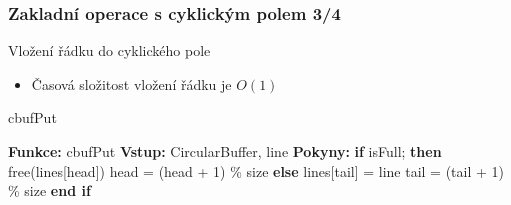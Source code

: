 \documentclass[]{fitthesispresn}
\begin{document}
    \begin{frame}
        \frametitle{Zakladní operace s cyklickým polem 3/4}
        Vložení řádku do cyklického pole
        \begin{itemize}
            \item Časová složitost vložení řádku je $O(1)$
        \end{itemize}
        \begin{algorithm}[H]
            \caption{cbufPut}
            \label{alg:cbufPut}
            \begin{algorithmic}[1]
                \State \textbf{Funkce:} cbufPut
                \State \textbf{Vstup:} CircularBuffer, line
                \State \textbf{Pokyny:}
                \State \hspace{\algorithmicindent} \textbf{if} isFull; \textbf{then}
                \State \hspace{\algorithmicindent} \hspace{\algorithmicindent} free(lines[head])
                \State \hspace{\algorithmicindent} \hspace{\algorithmicindent} head = (head + 1) \% size
                \State \hspace{\algorithmicindent} \textbf{else}
                \State \hspace{\algorithmicindent} \hspace{\algorithmicindent}  lines[tail] = line
                \State \hspace{\algorithmicindent} \hspace{\algorithmicindent}  tail = (tail + 1) \% size
                \State \hspace{\algorithmicindent} \textbf{end if}
            \end{algorithmic}
        \end{algorithm}
    \end{frame}
\end{document}
